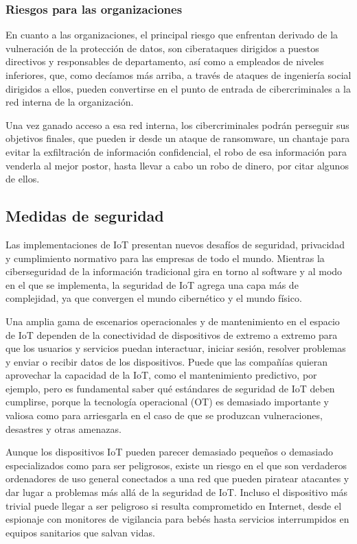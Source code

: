 \documentclass[12pt]{article}
\begin{document}
  \subsubsection*{Riesgos para las organizaciones}
  En cuanto a las organizaciones, el principal riesgo que enfrentan derivado de la vulneración de la protección de datos, son ciberataques dirigidos a puestos directivos y responsables de departamento, así como a empleados de niveles inferiores, que, como decíamos más arriba, a través de ataques de ingeniería social dirigidos a ellos, pueden convertirse en el punto de entrada de cibercriminales a la red interna de la organización.

  Una vez ganado acceso a esa red interna, los cibercriminales podrán perseguir sus objetivos finales, que pueden ir desde un ataque de ransomware, un chantaje para evitar la exfiltración de información confidencial, el robo de esa información para venderla al mejor postor, hasta llevar a cabo un robo de dinero, por citar algunos de ellos.

  \subsection*{Medidas de seguridad}
  Las implementaciones de IoT presentan nuevos desafíos de seguridad, privacidad y cumplimiento normativo para las empresas de todo el mundo. Mientras la ciberseguridad de la información tradicional gira en torno al software y al modo en el que se implementa, la seguridad de IoT agrega una capa más de complejidad, ya que convergen el mundo cibernético y el mundo físico. 
  
  Una amplia gama de escenarios operacionales y de mantenimiento en el espacio de IoT dependen de la conectividad de dispositivos de extremo a extremo para que los usuarios y servicios puedan interactuar, iniciar sesión, resolver problemas y enviar o recibir datos de los dispositivos. Puede que las compañías quieran aprovechar la capacidad de la IoT, como el mantenimiento predictivo, por ejemplo, pero es fundamental saber qué estándares de seguridad de IoT deben cumplirse, porque la tecnología operacional (OT) es demasiado importante y valiosa como para arriesgarla en el caso de que se produzcan vulneraciones, desastres y otras amenazas.

  Aunque los dispositivos IoT pueden parecer demasiado pequeños o demasiado especializados como para ser peligrosos, existe un riesgo en el que son verdaderos ordenadores de uso general conectados a una red que pueden piratear atacantes y dar lugar a problemas más allá de la seguridad de IoT. Incluso el dispositivo más trivial puede llegar a ser peligroso si resulta comprometido en Internet, desde el espionaje con monitores de vigilancia para bebés hasta servicios interrumpidos en equipos sanitarios que salvan vidas. 
\end{document}
